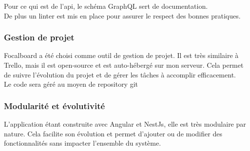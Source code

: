 Pour ce qui est de l'\Gls{api}, le schéma GraphQL sert de documentation.\\

De plus un linter est mis en place pour assurer le respect des bonnes pratiques.

\subsubsection{Gestion de projet}

Focalboard a été choisi comme outil de gestion de projet.
Il est très similaire à Trello, mais il est open-source et est auto-hébergé sur mon serveur.
Cela permet de suivre l'évolution du projet et de gérer les tâches à accomplir efficacement.\\

Le code sera géré au moyen de repository git

\subsubsection{Modularité et évolutivité}

L'application étant construite avec Angular et NestJs, elle est très modulaire par nature.
Cela facilite son évolution et permet d'ajouter ou de modifier des fonctionnalités sans impacter l'ensemble du système.


